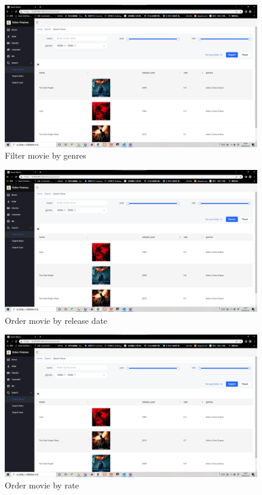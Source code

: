 \begin{CJK*}{UTF8}{gbsn}
    \begin{figure}[htbp]
    \centering
    \includegraphics[width=1\textwidth]{res_search5.png}
    \caption{Filter movie by genres}
    \end{figure}
    
    \begin{figure}[htbp]
    \centering
    \includegraphics[width=1\textwidth]{res_search6.png}
    \caption{Order movie by release date}
    \end{figure}
    
    \begin{figure}[htbp]
    \centering
    \includegraphics[width=1\textwidth]{res_search7.png}
    \caption{Order movie by rate}
    \end{figure}
    

\end{CJK*}
